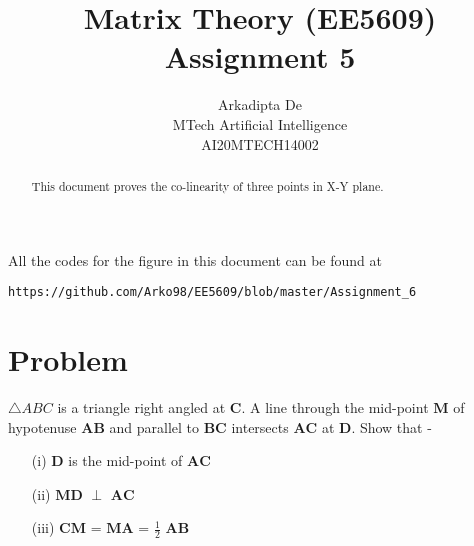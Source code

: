 \documentclass[journal,12pt,twocolumn]{IEEEtran}
\begin{document}
\makeatletter
{}
\makeatother
\let\StandardTheFigure\thefigure
\let\vec\mathbf
\renewcommand{\thefigure}{\theproblem}
\def\putbox#1#2#3{\makebox[0in][l]{\makebox[#1][l]{}\raisebox{\baselineskip}[0in][0in]{\raisebox{#2}[0in][0in]{#3}}}}
     \def\rightbox#1{\makebox[0in][r]{#1}}
     \def\centbox#1{\makebox[0in]{#1}}
     \def\topbox#1{\raisebox{-\baselineskip}[0in][0in]{#1}}
     \def\midbox#1{\raisebox{-0.5\baselineskip}[0in][0in]{#1}}
\vspace{3cm}
\title{Matrix Theory (EE5609) Assignment 5}
\author{Arkadipta De\\MTech Artificial Intelligence\\AI20MTECH14002}

\maketitle
\newpage
\bigskip
\renewcommand{\thefigure}{\theenumi}
\renewcommand{\thetable}{\theenumi}

\begin{abstract}
This document proves the co-linearity of three points in X-Y plane.
\end{abstract}

All the codes for the figure in this document can be found at
\begin{lstlisting}
https://github.com/Arko98/EE5609/blob/master/Assignment_6
\end{lstlisting}

\section{Problem}
$\triangle{ABC}$ is a triangle right angled at $\vec{C}$. A line through the mid-point $\vec{M}$ of hypotenuse $\vec{AB}$ and parallel to $\vec{BC}$ intersects $\vec{AC}$ at $\vec{D}$. Show that -
\begin{itemize}
\item[(i)] $\vec{D}$ is the mid-point of $\vec{AC}$ 
\item[(ii)] $\vec{MD}$ $\perp$ $\vec{AC}$   
\item[(iii)] $\vec{CM}$ = $\vec{MA}$ = $\frac{1}{2}$ $\vec{AB}$
\end{itemize}
\end{document}
